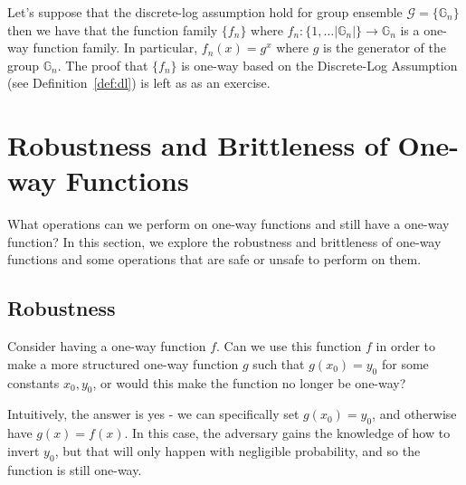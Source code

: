 
%
%
Let's suppose that the discrete-log assumption hold for group ensemble $\mathcal{G} = \{\mathbb{G}_n\}$ then we have that the function family $\{f_n\}$ where $f_n: \{1,\ldots |\mathbb{G}_n|\}\rightarrow \mathbb{G}_n$ is a one-way function family. In particular, $f_n(x) = g^x$ where $g$ is the generator of the group $\mathbb{G}_n$. The proof that $\{f_n\}$ is one-way based on the Discrete-Log Assumption (see Definition~\ref{def:dl}) is left as as an exercise. 


\section{Robustness and Brittleness of One-way Functions}
What operations can we perform on one-way functions and still have a one-way function? In this section, we explore the robustness and brittleness of one-way functions and some operations that are safe or unsafe to perform on them.

\subsection{Robustness}
Consider having a one-way function $f$.  Can we use this function $f$ in order to make a more structured one-way function $g$ such that $g(x_0) = y_0$ for some constants $x_0, y_0$, or would this make the function no longer be one-way? 

Intuitively, the answer is yes - we can specifically set $g(x_0) = y_0$, and otherwise have $g(x) = f(x)$.  In this case, the adversary gains the knowledge of how to invert $y_0$, but that will only happen with negligible probability, and so the function is still one-way.


